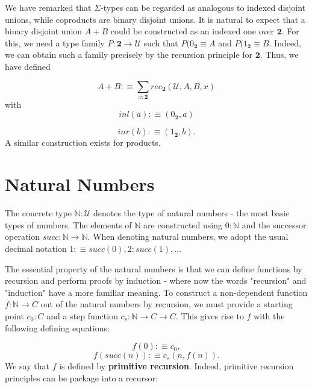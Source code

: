 \documentclass[letterpaper, 10 pt, conference]{ieeeconf}  %
\begin{document}
We have remarked that $\Sigma$-types can be regarded as analogous to indexed disjoint unions, while coproducts are binary disjoint unions. It is natural to expect that a binary disjoint union $A + B$ could be constructed as an indexed one over $\mathbf{2}$. For this, we need a type family $P : \mathbf{2} \rightarrow \mathcal{U}$ such that $P(0_{\mathbf{2}} \equiv A$ and $P(1_{\mathbf{2}} \equiv B$. Indeed, we can obtain such a family precisely by the recursion principle for $\mathbf{2}$. Thus, we have defined

\begin{equation}
    A + B :\equiv \sum_{x:\mathbf{2}} rec_{\mathbf{2}}(\mathcal{U},A,B,x)
\end{equation}
with
\begin{equation}
    inl(a) :\equiv (0_{\mathbf{2}}, a)
\end{equation}

\begin{equation}
    inr(b) :\equiv (1_{\mathbf{2}}, b).
\end{equation}
A similar construction exists for products.

\section{Natural Numbers}

The concrete type $\mathbb{N} : \mathcal{U}$ denotes the type of natural numbers - the most basic types of numbers. The elements of $\mathbb{N}$ are constructed using $0 : \mathbb{N}$ and the successor operation $succ : \mathbb{N} \rightarrow \mathbb{N}$. When denoting natural numbers, we adopt the usual decimal notation $1 :\equiv succ(0), 2 : succ(1), \ldots$

The essential property of the natural numbers is that we can define functions by recursion and perform proofs by induction - where now the words "recursion" and "induction" have a more familiar meaning. To construct a non-dependent function $f : \mathbb{N} \rightarrow C$ out of the natural numbers by recursion, we must provide a starting point $c_0: C$ and a step function $c_s: \mathbb{N} \rightarrow C \rightarrow C$. This gives rise to $f$ with the following defining equations:

\begin{equation}
    f(0) :\equiv c_0,
\end{equation}
\begin{equation}
    f(succ(n)) :\equiv c_s(n,f(n)).
\end{equation}
We say that $f$ is defined by \textbf{primitive recursion}. Indeed, primitive recursion principles can be package into a recursor:
\end{document}

